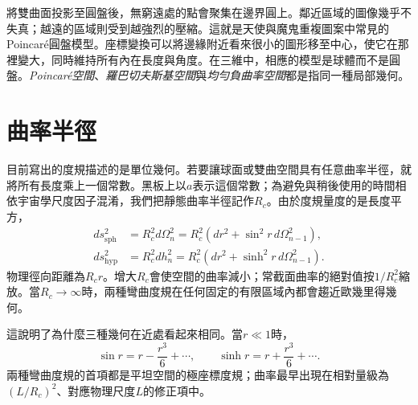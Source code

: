 將雙曲面投影至圓盤後，無窮遠處的點會聚集在邊界圓上。鄰近區域的圖像幾乎不失真；越遠的區域則受到越強烈的壓縮。這就是天使與魔鬼重複圖案中常見的Poincar\'e圓盤模型。座標變換可以將邊緣附近看來很小的圖形移至中心，使它在那裡變大，同時維持所有內在長度與角度。在三維中，相應的模型是球體而不是圓盤。\emph{Poincar\'e空間}、\emph{羅巴切夫斯基空間}與\emph{均勻負曲率空間}都是指同一種局部幾何。

\begin{classroomqa}
\end{classroomqa}

\section{曲率半徑}

目前寫出的度規描述的是單位幾何。若要讓球面或雙曲空間具有任意曲率半徑，就將所有長度乘上一個常數。黑板上以\(a\)表示這個常數；為避免與稍後使用的時間相依宇宙學尺度因子混淆，我們把靜態曲率半徑記作\(R_c\)。由於度規量度的是長度平方，
\begin{align}
ds_{\mathrm{sph}}^2
  &=R_c^2d\Omega_n^2
   =R_c^2\left(dr^2+\sin^2r\,d\Omega_{n-1}^2\right),\\
ds_{\mathrm{hyp}}^2
  &=R_c^2dh_n^2
   =R_c^2\left(dr^2+\sinh^2r\,d\Omega_{n-1}^2\right).
\label{eq:c03-scaled-curvature}
\end{align}
物理徑向距離為\(R_cr\)。增大\(R_c\)會使空間的曲率減小；常截面曲率的絕對值按\(1/R_c^2\)縮放。當\(R_c\to\infty\)時，兩種彎曲度規在任何固定的有限區域內都會趨近歐幾里得幾何。

\begin{classroomqa}
\end{classroomqa}

這說明了為什麼三種幾何在近處看起來相同。當\(r\ll1\)時，
\begin{equation}
\sin r=r-\frac{r^3}{6}+\cdots,
\qquad
\sinh r=r+\frac{r^3}{6}+\cdots.
\end{equation}
兩種彎曲度規的首項都是平坦空間的極座標度規；曲率最早出現在相對量級為\((L/R_c)^2\)、對應物理尺度\(L\)的修正項中。


